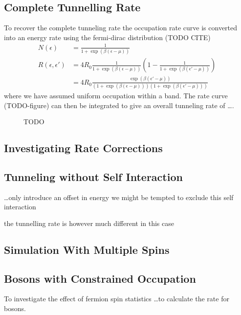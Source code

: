 \subsection{Complete Tunnelling Rate}
To recover the complete tunneling
rate the occupation rate curve
is converted into an
energy rate using the
fermi-dirac distribution (TODO CITE)
\begin{align}
    N(\epsilon)            & = \frac{1}{1 + \exp{(\beta(\epsilon - \mu))}}                                                                         \\
    R(\epsilon, \epsilon') & = 4R_0 \frac{1}{1 + \exp{(\beta(\epsilon - \mu))}}(1- \frac{1}{1 + \exp{(\beta(\epsilon' - \mu))}})                   \\
                           & = 4R_0 \frac{\exp{(\beta(\epsilon' - \mu))}}{(1 + \exp{(\beta(\epsilon - \mu))})(1 + \exp{(\beta(\epsilon' - \mu))})}
\end{align}
where we have assumed uniform
occupation within a band.
The rate curve (TODO-figure) can then be
integrated to give an
overall tunneling rate of \ldots.
\begin{figure}
    TODO
\end{figure}


\subsection{Investigating Rate Corrections}



\subsection{Tunneling without Self Interaction}
\ldots only introduce an offset in energy
we might be tempted to exclude this self interaction

the tunnelling rate is however much different
in this case





\subsection{Simulation With Multiple Spins}


\subsection{Bosons with Constrained Occupation}
To investigate the effect of fermion spin
statistics \ldots to calculate the rate
for bosons.
